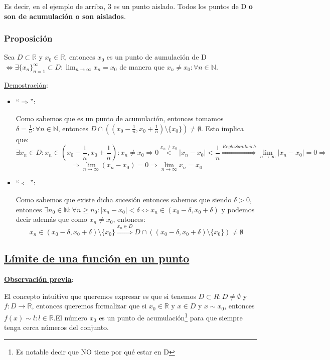 \documentclass[10pt,a4paper,openright]{book}
\begin{document}
Es decir, en el ejemplo de arriba, 3 es un punto aislado. Todos los puntos de D \textbf{o son de acumulación o son aislados}.

\subsubsection*{Proposición}
Sea $D\subset \mathbb R$ y $x_0\in \mathbb R$, entonces $x_0$ es un punto de aumulación de D $\Leftrightarrow \exists \{x_n\}_{n=1}^\infty \subset D: \lim_{n\rightarrow \infty} x_n=x_0$ de manera que $x_n\neq x_0: \forall n\in \mathbb N$.\par

\underline{Demostración}:
\begin{itemize}
\item ``$\Rightarrow $'':\par
Como sabemos que es un punto de acumulación, entonces tomamos $\delta=\frac{1}{n}: \forall n\in \mathbb N$, entonces $D\cap \left((x_0-\frac{1}{n}, x_0+\frac{1}{n})\mbox{\textbackslash} \{x_0\}\right)\neq \emptyset$. Esto implica que:
$$\exists x_n\in D: x_n\in \left(x_0-\frac{1}{n}, x_0+\frac{1}{n}\right): x_n\neq x_0\Rightarrow 0\stackrel{x_n\neq x_0}{<}|x_n-x_0|<\frac{1}{n} \stackrel{ReglaSandwich}{\Rightarrow} \lim_{n\rightarrow \infty} |x_n-x_0|=0\Rightarrow$$
$$\Rightarrow \lim_{n\rightarrow \infty} (x_n-x_0)=0\Rightarrow \lim_{n\rightarrow \infty} x_n=x_0$$

\item ``$\Leftarrow$'':\par
Como sabemos que existe dicha sucesión entonces sabemos que siendo $\delta >0$, entonces $\exists n_0\in \mathbb N: \forall n\geq n_0: |x_n-x_0|<\delta\Leftrightarrow x_n\in (x_0-\delta , x_0+\delta)$ y podemos decir además que como $x_n\neq x_0$, entonces:
$$x_n\in (x_0-\delta , x_0+\delta)\mbox{\textbackslash} \{x_0\}\stackrel{x_n\in D}{\Rightarrow} D\cap\left((x_0-\delta , x_0+\delta)\mbox{\textbackslash} \{x_0\}\right) \neq \emptyset$$
\end{itemize}

\subsection*{\underline{Límite de una función en un punto}}
\textbf{\underline{Observación previa}}:\par
El concepto intuitivo que queremos expresar es que si tenemos $D\subset R: D\neq \emptyset$ y $f: D\longrightarrow \mathbb R$, entonces queremos formalizar que si $x_0\in \mathbb R$ y $x\in D$ y $x\sim x_0$, entonces $f(x)\sim l: l\in \mathbb R$.El número $x_0$ es un punto de acumulación\footnote{Es notable decir que NO tiene por qué estar en D} para que siempre tenga cerca números del conjunto.
\end{document}
